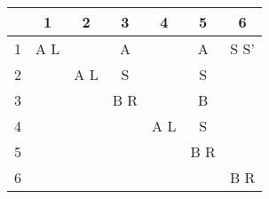 \documentclass[12pt,a4paper]{article}%
\begin{document}
\begin{center}
  \begin{tabular}{ c || c | c | c | c | c | c | }
      &  1  &  2  &  3  &  4  &  5  &  6   \\ \hline \hline
    1 & A L &     &  A  &     &  A  & S S' \\ \hline
    2 &     & A L &  S  &     &  S  &      \\ \hline
    3 &     &     & B R &     &  B  &      \\ \hline
    4 &     &     &     & A L &  S  &      \\ \hline
    5 &     &     &     &     & B R &      \\ \hline
    6 &     &     &     &     &     & B R  \\ \hline
  \end{tabular}
  \end{center}
\end{document}

